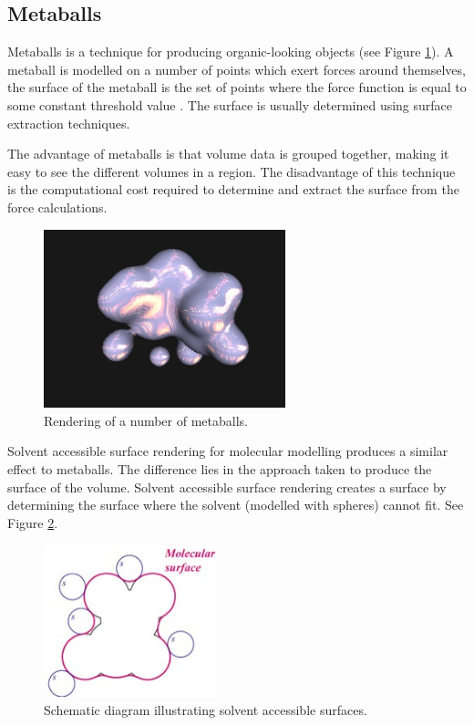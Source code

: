 
\subsection{Metaballs}
\label{sub:background_metaballs}

Metaballs is a technique for producing organic-looking objects (see Figure
\ref{fig:background_metaballs}). A metaball is modelled on a number of points
which exert forces around themselves, the surface of the metaball is the set of
points where the force function is equal to some constant threshold value
\citep{blinn82}. The surface is usually determined using surface extraction
techniques.

The advantage of metaballs is that volume data is grouped together, making it
easy to see the different volumes in a region. The disadvantage of this
technique is the computational cost required to determine and extract the
surface from the force calculations.

\begin{figure}[h!]
  \begin{center}
    \includegraphics[width=70mm]{metaballs}
  \end{center}
  \caption{Rendering of a number of metaballs.}
  \label{fig:background_metaballs}
\end{figure}

Solvent accessible surface rendering for molecular modelling \citep{connolly83}
produces a similar effect to metaballs. The difference lies in the approach
taken to produce the surface of the volume. Solvent accessible surface
rendering creates a surface by determining the surface where the solvent
(modelled with spheres) cannot fit. See Figure \ref{fig:background_sas}.

\begin{figure}[h!]
  \begin{center}
    \includegraphics[width=50mm]{sas_ms}
  \end{center}
  \caption{Schematic diagram illustrating solvent accessible surfaces.}
  \label{fig:background_sas}
\end{figure}

